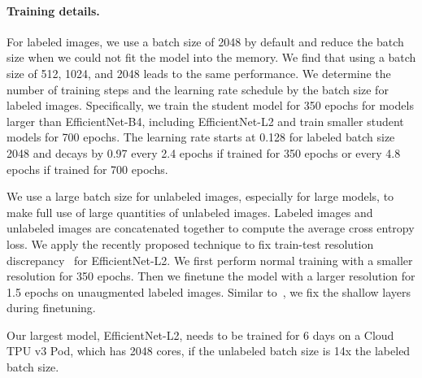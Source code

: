 \documentclass[10pt,twocolumn,letterpaper]{article}
\begin{document}
\paragraph{Training details.} For labeled images, we use a batch size of 2048 by default and reduce the batch size when we could not fit the model into the memory. We find that using a batch size of 512, 1024, and 2048 leads to the same performance. We determine the number of training steps and the learning rate schedule by the batch size for labeled images. Specifically, we train the student model for 350 epochs for models larger than EfficientNet-B4, including EfficientNet-L2 and train smaller student models for 700 epochs. The learning rate starts at 0.128 for labeled batch size 2048 and decays by 0.97 every 2.4 epochs if trained for 350 epochs or every 4.8 epochs if trained for 700 epochs. 

We use a large batch size for unlabeled images, especially for large models, to make full use of large quantities of  unlabeled images. Labeled images and unlabeled images are concatenated together to compute the average cross entropy loss.
We apply the recently proposed technique to fix train-test resolution discrepancy~\cite{touvron2019fixing} for EfficientNet-L2. We first perform normal training with a smaller resolution for 350 epochs. Then we finetune the model with a larger resolution for 1.5 epochs on unaugmented labeled images. Similar to~\cite{touvron2019fixing}, we fix the shallow layers during finetuning.


Our largest model, EfficientNet-L2, needs to be trained for 6 days on a Cloud TPU v3 Pod, which has 2048 cores, if the unlabeled batch size is 14x the labeled batch size. 
\end{document}
